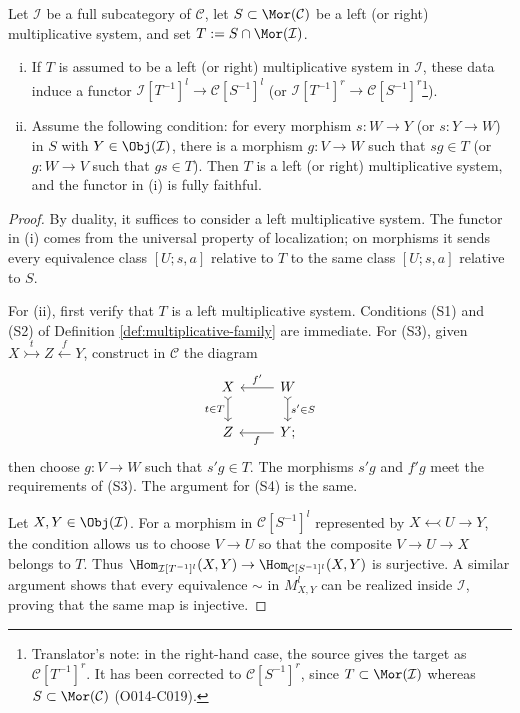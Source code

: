 \begin{proposition}\label{prop:subcat-localization}
	Let $\mathcal{I}$ be a full subcategory of $\mathcal{C}$, let
	$S\subset\Mor(\mathcal{C})$ be a left (or right) multiplicative system,
	and set $T:=S\cap\Mor(\mathcal{I})$.
	\begin{enumerate}[(i)]
		\item If $T$ is assumed to be a left (or right) multiplicative system
		in $\mathcal{I}$, these data induce a functor
		$\mathcal{I}[T^{-1}]^l\to\mathcal{C}[S^{-1}]^l$ (or
		$\mathcal{I}[T^{-1}]^r\to\mathcal{C}[S^{-1}]^r$\footnote{Translator's
		note: in the right-hand case, the source gives the target as
		$\mathcal{C}[T^{-1}]^r$. It has been corrected to
		$\mathcal{C}[S^{-1}]^r$, since $T\subset\Mor(\mathcal{I})$ whereas
		$S\subset\Mor(\mathcal{C})$ (O014-C019).}).
		\item Assume the following condition: for every morphism $s:W\to Y$ (or
		$s:Y\to W$) in $S$ with $Y\in\Obj(\mathcal{I})$, there is a morphism
		$g:V\to W$ such that $sg\in T$ (or $g:W\to V$ such that $gs\in T$).
		Then $T$ is a left (or right) multiplicative system, and the functor in
		(i) is fully faithful.
	\end{enumerate}
\end{proposition}
\begin{proof}
	By duality, it suffices to consider a left multiplicative system. The
	functor in (i) comes from the universal property of localization; on
	morphisms it sends every equivalence class $[U;s,a]$ relative to $T$ to
	the same class $[U;s,a]$ relative to $S$.

	For (ii), first verify that $T$ is a left multiplicative system. Conditions
	(S1) and (S2) of Definition \ref{def:multiplicative-family} are immediate.
	For (S3), given
	$X\stackrel{t}{\rightarrowtail}Z\stackrel{f}{\leftarrow}Y$, construct in
	$\mathcal{C}$ the diagram
	\[\begin{tikzcd}
		X \arrow[rightarrowtail, d, "{t \in T}"'] & W \arrow[l, "{f'}"'] \arrow[rightarrowtail, d, "{s' \in S}"] \\
		Z & Y \arrow[l, "f"] ;
	\end{tikzcd}\]
	then choose $g:V\to W$ such that $s'g\in T$. The morphisms $s'g$ and
	$f'g$ meet the requirements of (S3). The argument for (S4) is the same.

	Let $X,Y\in\Obj(\mathcal{I})$. For a morphism in
	$\mathcal{C}[S^{-1}]^l$ represented by $X\leftarrowtail U\to Y$, the
	condition allows us to choose $V\to U$ so that the composite
	$V\to U\to X$ belongs to $T$. Thus
	$\Hom_{\mathcal{I}[T^{-1}]^l}(X,Y)\to
	\Hom_{\mathcal{C}[S^{-1}]^l}(X,Y)$ is surjective. A similar argument
	shows that every equivalence $\sim$ in $M_{X,Y}^l$ can be realized inside
	$\mathcal{I}$, proving that the same map is injective.
\end{proof}

